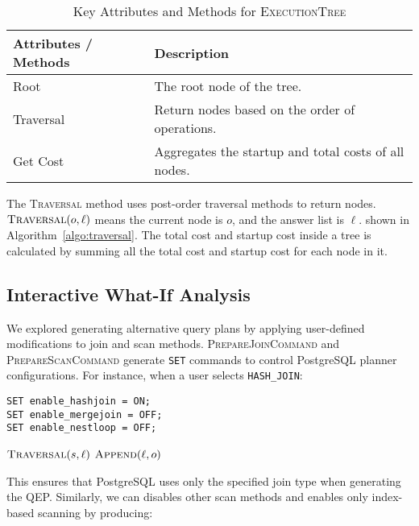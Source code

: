 \begin{table}[ht]
    \centering
    \begin{tabular}{l|l}
    \toprule
        \textbf{Attributes / Methods} & \textbf{Description} \\
    \midrule
        Root & The root node of the tree. \\
    \midrule
        Traversal & Return nodes based on the order of operations.\\
        Get Cost & Aggregates the startup and total costs of all nodes.\\
    \bottomrule
    \end{tabular}
    \caption{Key Attributes and Methods for \textsc{ExecutionTree}}
    \label{tab:ExecutionTree_attributes}
\end{table}

The \textsc{Traversal} method uses post-order traversal methods to return nodes. $\textsc{Traversal}(o, \ell)$ means the current node is $o$, and the answer list is $\ell$. shown in Algorithm~\ref{algo:traversal}. The total cost and startup cost inside a tree is calculated by summing all the total cost and startup cost for each node in it.

\subsection{Interactive What-If Analysis}
\label{subsec:whatif-algo}

We explored generating alternative query plans by applying user-defined modifications to join and scan methods. \textsc{PrepareJoinCommand} and \textsc{PrepareScanCommand} generate \texttt{SET} commands to control PostgreSQL planner configurations. For instance, when a user selects \texttt{HASH\_JOIN}:
\begin{lstlisting}
SET enable_hashjoin = ON;
SET enable_mergejoin = OFF;
SET enable_nestloop = OFF;
\end{lstlisting}

\begin{algorithm}
	\caption{$\textsc{Traversal}(o, \ell)$}
    \label{algo:traversal}
	\begin{algorithmic}
            \State $\textsc{Traversal}(s, \ell)$
        \EndFor
        \State$\textsc{Append}(\ell, o)$
	\end{algorithmic} 
\end{algorithm}

This ensures that PostgreSQL uses only the specified join type when generating the QEP. Similarly, we can disables other scan methods and enables only index-based scanning by producing:

